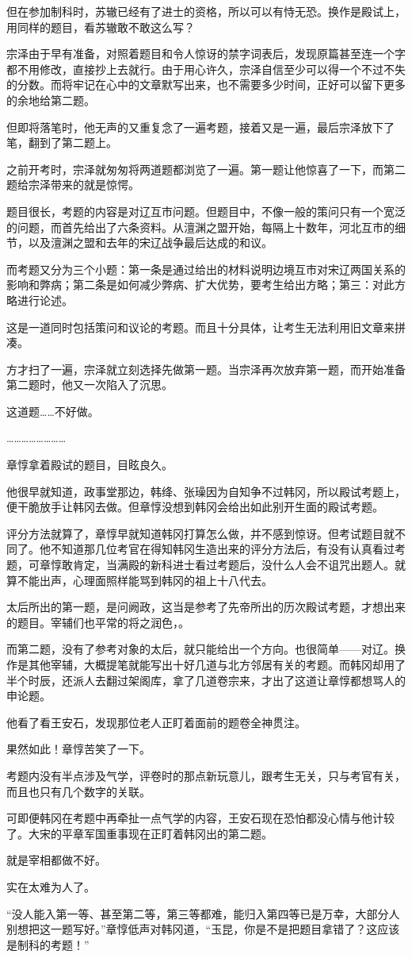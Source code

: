 但在参加制科时，苏辙已经有了进士的资格，所以可以有恃无恐。换作是殿试上，用同样的题目，看苏辙敢不敢这么写？

宗泽由于早有准备，对照着题目和令人惊讶的禁字词表后，发现原篇甚至连一个字都不用修改，直接抄上去就行。由于用心许久，宗泽自信至少可以得一个不过不失的分数。而将牢记在心中的文章默写出来，也不需要多少时间，正好可以留下更多的余地给第二题。

但即将落笔时，他无声的又重复念了一遍考题，接着又是一遍，最后宗泽放下了笔，翻到了第二题上。

之前开考时，宗泽就匆匆将两道题都浏览了一遍。第一题让他惊喜了一下，而第二题给宗泽带来的就是惊愕。

题目很长，考题的内容是对辽互市问题。但题目中，不像一般的策问只有一个宽泛的问题，而首先给出了六条资料。从澶渊之盟开始，每隔上十数年，河北互市的细节，以及澶渊之盟和去年的宋辽战争最后达成的和议。

而考题又分为三个小题：第一条是通过给出的材料说明边境互市对宋辽两国关系的影响和弊病；第二条是如何减少弊病、扩大优势，要考生给出方略；第三：对此方略进行论述。

这是一道同时包括策问和议论的考题。而且十分具体，让考生无法利用旧文章来拼凑。

方才扫了一遍，宗泽就立刻选择先做第一题。当宗泽再次放弃第一题，而开始准备第二题时，他又一次陷入了沉思。

这道题……不好做。

……………………

章惇拿着殿试的题目，目眩良久。

他很早就知道，政事堂那边，韩绛、张璪因为自知争不过韩冈，所以殿试考题上，便干脆放手让韩冈去做。但章惇没想到韩冈会给出如此别开生面的殿试考题。

评分方法就算了，章惇早就知道韩冈打算怎么做，并不感到惊讶。但考试题目就不同了。他不知道那几位考官在得知韩冈生造出来的评分方法后，有没有认真看过考题，可章惇敢肯定，当满殿的新科进士看过考题后，没什么人会不诅咒出题人。就算不能出声，心理面照样能骂到韩冈的祖上十八代去。

太后所出的第一题，是问阙政，这当是参考了先帝所出的历次殿试考题，才想出来的题目。宰辅们也平常的将之润色，。

而第二题，没有了参考对象的太后，就只能给出一个方向。也很简单——对辽。换作是其他宰辅，大概提笔就能写出十好几道与北方邻居有关的考题。而韩冈却用了半个时辰，还派人去翻过架阁库，拿了几道卷宗来，才出了这道让章惇都想骂人的申论题。

他看了看王安石，发现那位老人正盯着面前的题卷全神贯注。

果然如此！章惇苦笑了一下。

考题内没有半点涉及气学，评卷时的那点新玩意儿，跟考生无关，只与考官有关，而且也只有几个数字的关联。

可即便韩冈在考题中再牵扯一点气学的内容，王安石现在恐怕都没心情与他计较了。大宋的平章军国重事现在正盯着韩冈出的第二题。

就是宰相都做不好。

实在太难为人了。

“没人能入第一等、甚至第二等，第三等都难，能归入第四等已是万幸，大部分人别想把这一题写好。”章惇低声对韩冈道，“玉昆，你是不是把题目拿错了？这应该是制科的考题！”
